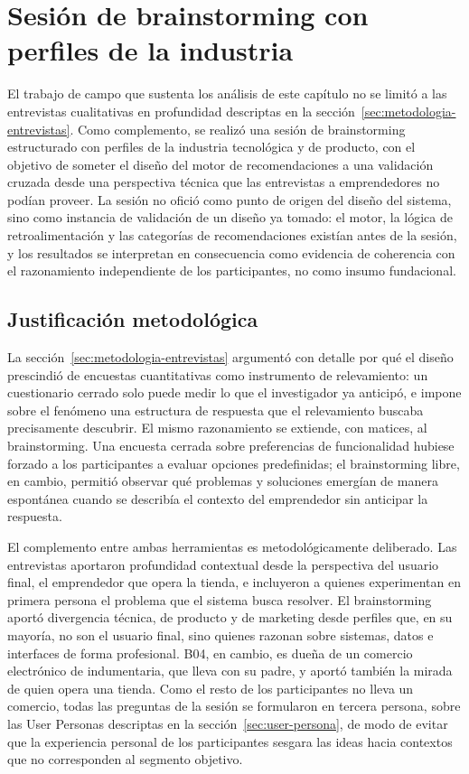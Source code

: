 \section{Sesión de brainstorming con perfiles de la industria}
\label{sec:brainstorming}

El trabajo de campo que sustenta los análisis de este capítulo no se limitó a las entrevistas cualitativas en profundidad descriptas en la sección~\ref{sec:metodologia-entrevistas}. Como complemento, se realizó una sesión de brainstorming estructurado con perfiles de la industria tecnológica y de producto, con el objetivo de someter el diseño del motor de recomendaciones a una validación cruzada desde una perspectiva técnica que las entrevistas a emprendedores no podían proveer. La sesión no ofició como punto de origen del diseño del sistema, sino como instancia de validación de un diseño ya tomado: el motor, la lógica de retroalimentación y las categorías de recomendaciones existían antes de la sesión, y los resultados se interpretan en consecuencia como evidencia de coherencia con el razonamiento independiente de los participantes, no como insumo fundacional.

\subsection{Justificación metodológica}
\label{sec:brainstorming-justificacion}

La sección~\ref{sec:metodologia-entrevistas} argumentó con detalle por qué el diseño prescindió de encuestas cuantitativas como instrumento de relevamiento: un cuestionario cerrado solo puede medir lo que el investigador ya anticipó, e impone sobre el fenómeno una estructura de respuesta que el relevamiento buscaba precisamente descubrir. El mismo razonamiento se extiende, con matices, al brainstorming. Una encuesta cerrada sobre preferencias de funcionalidad hubiese forzado a los participantes a evaluar opciones predefinidas; el brainstorming libre, en cambio, permitió observar qué problemas y soluciones emergían de manera espontánea cuando se describía el contexto del emprendedor sin anticipar la respuesta.

El complemento entre ambas herramientas es metodológicamente deliberado. Las entrevistas aportaron profundidad contextual desde la perspectiva del usuario final, el emprendedor que opera la tienda, e incluyeron a quienes experimentan en primera persona el problema que el sistema busca resolver. El brainstorming aportó divergencia técnica, de producto y de marketing desde perfiles que, en su mayoría, no son el usuario final, sino quienes razonan sobre sistemas, datos e interfaces de forma profesional. B04, en cambio, es dueña de un comercio electrónico de indumentaria, que lleva con su padre, y aportó también la mirada de quien opera una tienda. Como el resto de los participantes no lleva un comercio, todas las preguntas de la sesión se formularon en tercera persona, sobre las User Personas descriptas en la sección~\ref{sec:user-persona}, de modo de evitar que la experiencia personal de los participantes sesgara las ideas hacia contextos que no corresponden al segmento objetivo.

